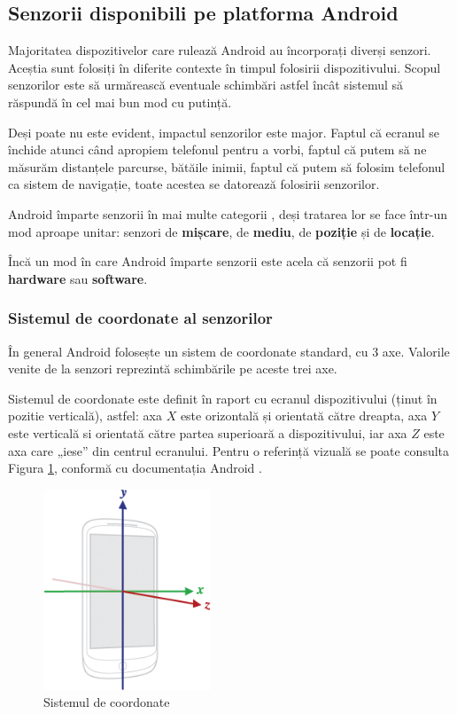 \documentclass[12pt, a4paper, oneside]{article}
\begin{document}
\newpage
\subsection{Senzorii disponibili pe platforma Android}
Majoritatea dispozitivelor care rulează Android au încorporați diverși senzori. Aceștia sunt folosiți în diferite contexte în timpul folosirii dispozitivului. Scopul senzorilor este să urmărească eventuale schimbări astfel încât sistemul să răspundă în cel mai bun mod cu putință.

	Deși poate nu este evident, impactul senzorilor este major. Faptul că ecranul se închide atunci când apropiem telefonul pentru a vorbi, faptul că putem să ne măsurăm distanțele parcurse, bătăile inimii, faptul că putem să folosim telefonul ca sistem de navigație, toate acestea se datorează folosirii senzorilor.
	
	Android împarte senzorii în mai multe categorii \cite{DeveloperAndroid}, deși tratarea lor se face într-un mod aproape unitar: senzori de \textbf{mișcare}, de \textbf{mediu}, de \textbf{poziție} și de \textbf{locație}.

	Încă un mod în care Android împarte senzorii este acela că senzorii pot fi \textbf{hardware} sau \textbf{software}.\\
	
\subsubsection{Sistemul de coordonate al senzorilor}
În general Android folosește un sistem de coordonate standard, cu 3 axe. Valorile venite de la senzori reprezintă schimbările pe aceste trei axe.

Sistemul de coordonate este definit în raport cu ecranul dispozitivului (ținut în pozitie verticală), astfel: axa $X$ este orizontală și orientată către dreapta, axa $Y$ este verticală si orientată către partea superioară a dispozitivului, iar axa $Z$ este axa care „iese” din centrul ecranului. Pentru o referință vizuală se poate consulta Figura \ref{fig:axis_device}, conformă cu documentația Android \cite{DeveloperAndroid}.

\begin{figure}[hbtp]
\centering
\includegraphics[width=5cm]{figures/axis_device.png}
\caption{Sistemul de coordonate}
\label{fig:axis_device}
\end{figure}
\end{document}
